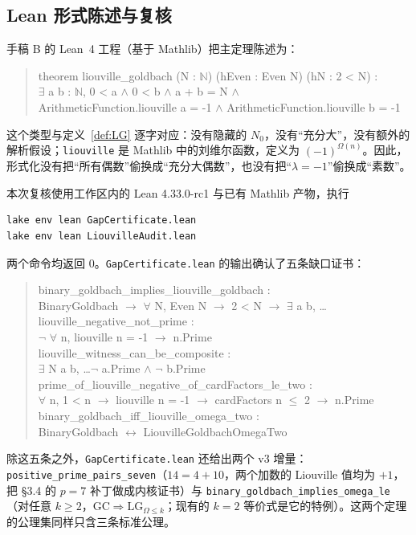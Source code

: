 \documentclass[11pt,a4paper]{ctexart}
\theoremstyle{plain}
\theoremstyle{definition}
\newcommand{\li}{\lambda}
\newcommand{\Om}{\Omega}
\newcommand{\code}[1]{\texttt{#1}}
\begin{document}
\subsection{Lean 形式陈述与复核}
\label{sec:lean}

手稿 B 的 Lean~4\cite{lean4} 工程（基于 Mathlib\cite{mathlib}）把主定理陈述为：
\begin{quote}\ttfamily\small
theorem liouville\_goldbach (N : $\mathbb{N}$) (hEven : Even N) (hN : 2 < N) :\\
\quad $\exists$ a b : $\mathbb{N}$, 0 < a $\wedge$ 0 < b $\wedge$ a + b = N $\wedge$\\
\quad\quad ArithmeticFunction.liouville a = -1 $\wedge$ ArithmeticFunction.liouville b = -1
\end{quote}
这个类型与定义~\ref{def:LG} 逐字对应：没有隐藏的 $N_0$，没有“充分大”，没有额外的解析假设；\code{liouville} 是 Mathlib 中的刘维尔函数，定义为 $(-1)^{\Om(n)}$。因此，形式化没有把“所有偶数”偷换成“充分大偶数”，也没有把“$\li=-1$”偷换成“素数”。

本次复核使用工作区内的 Lean 4.33.0-rc1 与已有 Mathlib 产物，执行
\begin{verbatim}
lake env lean GapCertificate.lean
lake env lean LiouvilleAudit.lean
\end{verbatim}
两个命令均返回 0。\code{GapCertificate.lean} 的输出确认了五条缺口证书：
\begin{quote}\ttfamily\small
binary\_goldbach\_implies\_liouville\_goldbach :\\
\quad BinaryGoldbach $\to$ $\forall$ N, Even N $\to$ 2 < N $\to$ $\exists$ a b, \dots\\
liouville\_negative\_not\_prime :\\
\quad $\neg$ $\forall$ n, liouville n = -1 $\to$ n.Prime\\
liouville\_witness\_can\_be\_composite :\\
\quad $\exists$ N a b, \dots $\neg$ a.Prime $\wedge$ $\neg$ b.Prime\\
prime\_of\_liouville\_negative\_of\_cardFactors\_le\_two :\\
\quad $\forall$ n, 1 < n $\to$ liouville n = -1 $\to$ cardFactors n $\le$ 2 $\to$ n.Prime\\
binary\_goldbach\_iff\_liouville\_omega\_two :\\
\quad BinaryGoldbach $\leftrightarrow$ LiouvilleGoldbachOmegaTwo
\end{quote}
除这五条之外，\code{GapCertificate.lean} 还给出两个 v3 增量：\code{positive\_prime\_pairs\_seven}（\(14=4+10\)，两个加数的 Liouville 值均为 \(+1\)，把 §3.4 的 \(p=7\) 补丁做成内核证书）与 \code{binary\_goldbach\_implies\_omega\_le}（对任意 \(k\ge2\)，\(\mathrm{GC}\Rightarrow\mathrm{LG}_{\Omega\le k}\)；现有的 \(k=2\) 等价式是它的特例）。这两个定理的公理集同样只含三条标准公理。
\end{document}
